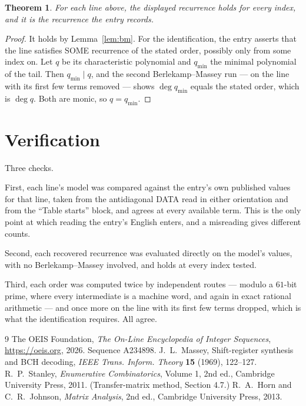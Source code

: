 \documentclass[11pt,a4paper]{article}
\theoremstyle{plain}
\newtheorem{theorem}{Theorem}
\theoremstyle{definition}
\begin{document}
\begin{theorem}
For each line above, the displayed recurrence holds for every index, and it is the recurrence
the entry records.
\end{theorem}

\begin{proof}
It holds by Lemma~\ref{lem:bm}. For the identification, the entry asserts that the line
satisfies SOME recurrence of the stated order, possibly only from some index on. Let $q$ be its
characteristic polynomial and $q_{\min}$ the minimal polynomial of the tail. Then
$q_{\min}\mid q$, and the second Berlekamp--Massey run --- on the line with its first few
terms removed --- shows $\deg q_{\min}$ equals the stated order, which is $\deg q$. Both are
monic, so $q=q_{\min}$.
\end{proof}

\section{Verification}

Three checks.

First, each line's model was compared against the entry's own published values for that line,
taken from the antidiagonal DATA read in either orientation and from the ``Table starts''
block, and agrees at every available term. This is the only point at which reading the entry's
English enters, and a misreading gives different counts.

Second, each recovered recurrence was evaluated directly on the model's values, with no
Berlekamp--Massey involved, and holds at every index tested.

Third, each order was computed twice by independent routes --- modulo a $61$-bit prime, where
every intermediate is a machine word, and again in exact rational arithmetic --- and once more
on the line with its first few terms dropped, which is what the identification requires. All
agree.

\begin{thebibliography}{9}
 The OEIS Foundation, \emph{The On-Line Encyclopedia of Integer
Sequences}, \url{https://oeis.org}, 2026. Sequence A234898.
 J.~L.~Massey, Shift-register synthesis and BCH decoding, \emph{IEEE
Trans. Inform. Theory} \textbf{15} (1969), 122--127.
 R.~P.~Stanley, \emph{Enumerative Combinatorics}, Volume 1, 2nd ed.,
Cambridge University Press, 2011. (Transfer-matrix method, Section 4.7.)
 R.~A.~Horn and C.~R.~Johnson, \emph{Matrix Analysis}, 2nd ed., Cambridge
University Press, 2013.
\end{thebibliography}
\end{document}
